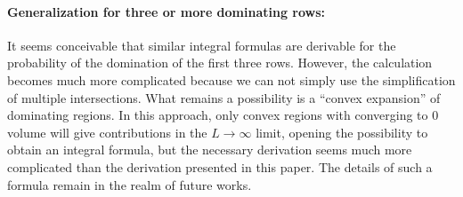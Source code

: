 \documentclass{article}
\theoremstyle{definition}
\begin{document}
\paragraph{Generalization for three or more dominating rows:}
It seems conceivable that similar integral formulas are derivable for the probability of the domination of the first three rows. However, the calculation becomes much more complicated because we can not simply use the simplification of multiple intersections. What remains a possibility is a ``convex expansion'' of dominating regions. In this approach, only convex regions with converging to $0$ volume will give contributions in the $L\to \infty$ limit, opening the possibility to obtain an integral formula, but the necessary derivation seems much more complicated than the derivation presented in this paper.
The details of such a formula remain in the realm of future works.
\end{document}
